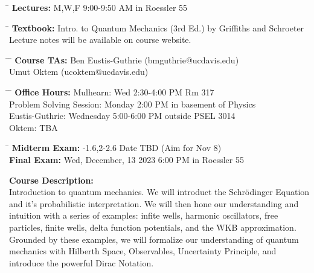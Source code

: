 \documentclass[12pt]{article}
\begin{document}
\noindent
\begin{tabbing}
\hspace*{8em} \= \kill 
\textbf {Lectures:} \> M,W,F 9:00-9:50 AM in Roessler 55 
\end{tabbing}
\noindent
\begin{tabbing}
\hspace*{8em} \= \kill 
\textbf{Textbook:} \> Intro. to Quantum Mechanics (3rd Ed.) by Griffiths and Schroeter \\
\> Lecture notes will be available on course website.
\end{tabbing}
\noindent
\begin{tabbing}
\hspace*{8em}\= \hspace*{14em} \= \kill 
\textbf{Course TAs:} \> Ben Eustis-Guthrie \> (bmguthrie@ucdavis.edu) \\
                     \> Umut Oktem \> (ucoktem@ucdavis.edu) 
\end{tabbing}
\noindent
\begin{tabbing}
\hspace*{8em}\= \hspace*{14em} \= \kill 
\textbf{Office Hours:}    \> Mulhearn: \> Wed 2:30-4:00 PM Rm 317\\
    \> Problem Solving Session: \> Monday 2:00 PM in basement of Physics \\
    \> Eustis-Guthrie: \> Wednesday 5:00-6:00 PM outside PSEL 3014 \\
    \> Oktem: \> TBA \\
\end{tabbing}

\noindent
\begin{tabbing}
\hspace*{12em}\= \kill 
\textbf{Midterm Exam:} -1.6,2-2.6 Date TBD (Aim for Nov 8)\\
\textbf{Final Exam:} \> Wed, December, 13 2023 6:00 PM in Roessler 55
\end{tabbing}
\noindent
\textbf {Course Description:}\\
Introduction to quantum mechanics.  We will introduct the
Schr\"odinger Equation and it's probabilistic interpretation.  We will
then hone our understanding and intuition with a series of examples:
infite wells, harmonic oscillators, free particles, finite wells,
delta function potentials, and the WKB approximation.  Grounded by
these examples, we will formalize our understanding of quantum
mechanics with Hilberth Space, Observables, Uncertainty Principle, and
introduce the powerful Dirac Notation.\\ 
\end{document}
